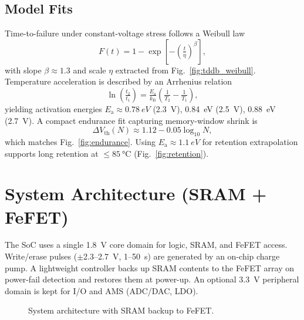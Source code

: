 \documentclass[conference]{IEEEtran}
\newcommand{\Vth}{V_{\mathrm{th}}}
\newcommand{\Ea}{E_{\mathrm{a}}}
\newcommand{\betaW}{\beta} %
\newcommand{\etaW}{\eta}   %
\newcommand{\kB}{k_{\mathrm{B}}} %
\begin{document}
\subsection{Model Fits}
Time-to-failure under constant-voltage stress follows a Weibull law
\begin{equation}
  F(t)=1-\exp\!\left[-\left(\tfrac{t}{\etaW}\right)^{\betaW}\right],
  \label{eq:weibull}
\end{equation}
with slope $\betaW \approx 1.3$ and scale $\etaW$ extracted from Fig.~\ref{fig:tddb_weibull}.
Temperature acceleration is described by an Arrhenius relation
\begin{equation}
  \ln\!\left(\tfrac{t_2}{t_1}\right)=\tfrac{\Ea}{\kB}\!\left(\tfrac{1}{T_2}-\tfrac{1}{T_1}\right),
  \label{eq:arrhenius}
\end{equation}
yielding activation energies $\Ea \approx \SI{0.78}{eV}$ (2.3~V), \SI{0.84}{eV} (2.5~V), \SI{0.88}{eV} (2.7~V).
A compact endurance fit capturing memory-window shrink is
\begin{equation}
  \Delta \Vth(N) \approx 1.12 - 0.05\log_{10} N,
  \label{eq:endurance}
\end{equation}
which matches Fig.~\ref{fig:endurance}.
Using $\Ea \approx \SI{1.1}{eV}$ for retention extrapolation supports long retention at $\le \SI{85}{\celsius}$ (Fig.~\ref{fig:retention}).

\section{System Architecture (SRAM + FeFET)}
The SoC uses a single 1.8~V core domain for logic, SRAM, and FeFET access.
Write/erase pulses ($\pm$2.3--2.7~V, 1--50~\mu s) are generated by an on-chip charge pump.
A lightweight controller backs up SRAM contents to the FeFET array on power-fail detection and restores them at power-up.
An optional 3.3~V peripheral domain is kept for I/O and AMS (ADC/DAC, LDO).

\clearpage

\begin{figure}[!t]
  \centering
  \vspace{-2pt}
  \caption{System architecture with SRAM backup to FeFET.}
  \label{fig:system}
  \vspace{-2mm}
\end{figure}
\end{document}

